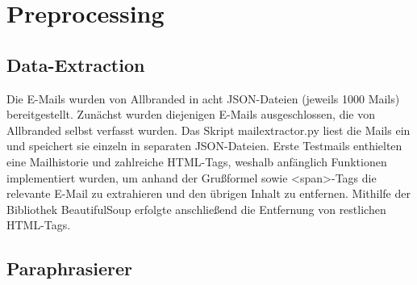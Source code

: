 \section{Preprocessing}

\subsection{Data-Extraction}

Die E-Mails wurden von Allbranded in acht JSON-Dateien (jeweils 1000 Mails) bereitgestellt.
Zunächst wurden diejenigen E-Mails ausgeschlossen, die von Allbranded selbst verfasst
wurden. Das Skript mail\textunderscore extractor.py liest die Mails ein und speichert sie einzeln in
separaten JSON-Dateien. Erste Testmails enthielten eine Mailhistorie und zahlreiche
HTML-Tags, weshalb anfänglich Funktionen implementiert wurden, um anhand der Grußformel
sowie <span>-Tags die relevante E-Mail zu extrahieren und den übrigen Inhalt zu entfernen.
Mithilfe der Bibliothek BeautifulSoup erfolgte anschließend die Entfernung von restlichen
HTML-Tags. 

\subsection{Paraphrasierer}

